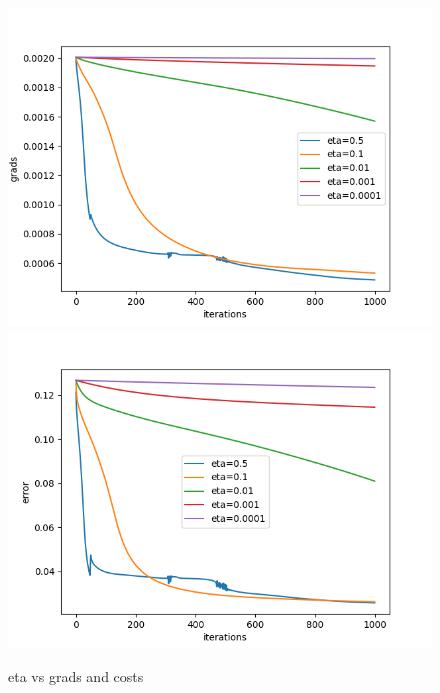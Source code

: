 \documentclass[11pt]{article}
\begin{document}
\begin{figure}[H]
\centering
\includegraphics[scale=0.5]{images/NN_boundary_vs_learning_rates/grads}
\includegraphics[scale=0.5]{images/NN_boundary_vs_learning_rates/errors}
\caption{eta vs grads and costs}
\label{fig: grad_vs_grads_costs}
\end{figure}
\end{document}

